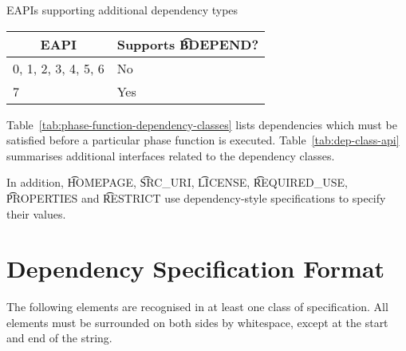 \begin{centertable}{EAPIs supporting additional dependency types}
    \label{tab:depend-table}
    \begin{tabular}{ll}
      \toprule
      \multicolumn{1}{c}{\textbf{EAPI}} &
      \multicolumn{1}{c}{\textbf{Supports \t{BDEPEND}?}} \\
      \midrule
      0, 1, 2, 3, 4, 5, 6 & No  \\
      7                   & Yes \\
      \bottomrule
    \end{tabular}
\end{centertable}

Table~\ref{tab:phase-function-dependency-classes} lists dependencies which must be satisfied before
a particular phase function is executed. Table~\ref{tab:dep-class-api} summarises additional
interfaces related to the dependency classes.

In addition, \t{HOMEPAGE}, \t{SRC_URI}, \t{LICENSE}, \t{REQUIRED_USE}, \t{PROPERTIES} and
\t{RESTRICT} use dependency-style specifications to specify their values.

\section{Dependency Specification Format}
\label{sec:dependency-spec}

The following elements are recognised in at least one class of specification. All elements must
be surrounded on both sides by whitespace, except at the start and end of the string.

